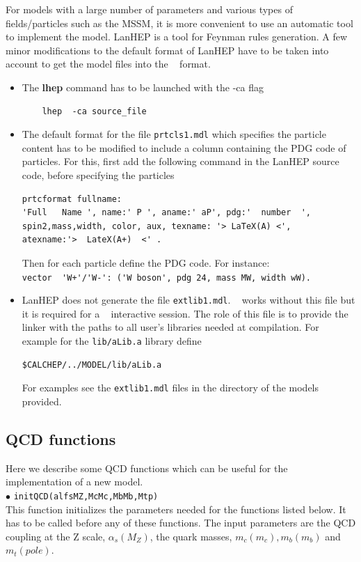 \documentclass[12pt,a4paper]{article}
\begin{document}
For models with a large number of parameters and various types of fields/particles such as  the MSSM, it is more convenient to use an automatic tool to implement 
the model.  LanHEP is a  tool for Feynman  rules  generation. A few minor
modifications to the default format of LanHEP have to be taken into account to get the model files into
the \micro~ format. 
\begin{itemize}
\item  The {\bf lhep}  command has to be launched with the {-ca} flag  
\begin{verbatim}
    lhep  -ca source_file 
\end{verbatim}

\item The default format for the file \verb|prtcls1.mdl| which specifies the particle content has to be
modified to include a column containing the PDG code of particles. 
For this, first add the following command in the LanHEP source code, before specifying the particles  
\begin{verbatim}
prtcformat fullname:
'Full   Name ', name:' P ', aname:' aP', pdg:'  number  ',
spin2,mass,width, color, aux, texname: '> LaTeX(A) <',
atexname:'>  LateX(A+)  <' .
\end{verbatim}

Then for each particle  define the PDG code. For
instance:\\
\verb|vector  'W+'/'W-': ('W boson', pdg 24, mass MW, width wW).|\\




\item LanHEP does not generate the  file \verb|extlib1.mdl|.
\micro~ works without  this file but it is required for a \calchep~ interactive session. 
The role of this file is to provide the linker with the paths to all user's libraries
needed at compilation. For example for the \verb|lib/aLib.a| library define
\begin{verbatim}
$CALCHEP/../MODEL/lib/aLib.a
\end{verbatim}
For  examples see the \verb|extlib1.mdl| files in the  directory of the models provided.  

\end{itemize}

\subsection{QCD functions}
Here we describe some QCD functions which can be useful for the implementation of a new model.\\
\noindent$\bullet$ \verb|initQCD(alfsMZ,McMc,MbMb,Mtp)|\\
This function initializes the parameters needed for the functions
listed below. It has to be called before any of these functions.
The input parameters are the QCD coupling at the Z scale,
$\alpha_s(M_Z)$, the quark masses, $m_c(m_c), m_b(m_b)$ and
$m_t(pole)$.
\end{document}
